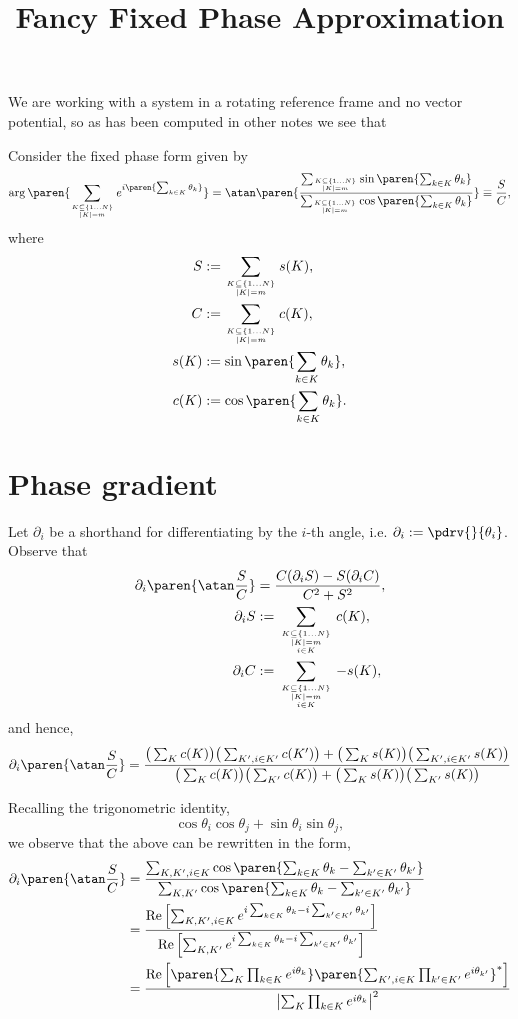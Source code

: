 \documentclass[onecolumn,amsmath,amssymb,nofootinbib,floatfix]{revtex4}
\title{Fancy Fixed Phase Approximation}
\begin{document}
We are working with a system in a rotating reference frame and no vector potential, so as has been computed in other notes we see that

Consider the fixed phase form given by
$$\arg\paren{\sum_{K\subseteq \{1\dots N\}\atop |K|=m} e^{i\paren{\sum_{k\in K} \theta_k}}}=\atan\paren{\frac{\sum_{K\subseteq \{1\dots N\}\atop |K|=m} \sin\paren{\sum_{k\in K} \theta_k}}{\sum_{K\subseteq \{1\dots N\}\atop |K|=m} \cos\paren{\sum_{k\in K} \theta_k}}}\equiv\frac{S}{C},
$$
where
$$
\begin{aligned}
S&:=\sum_{K\subseteq \{1\dots N\}\atop |K|=m} s(K),\\
C&:=\sum_{K\subseteq \{1\dots N\}\atop |K|=m} c(K),\\
s(K)&:=\sin\paren{\sum_{k\in K} \theta_k},\\
c(K)&:=\cos\paren{\sum_{k\in K} \theta_k}.\\
\end{aligned}
$$

\section{Phase gradient}

Let $\partial_i$ be a shorthand for differentiating by the $i$-th angle, i.e. $\partial_i:=\pdrv{}{\theta_i}$.  Observe that
$$
\begin{aligned}
\partial_i \paren{\atan\frac{S}{C}} &= \frac{C(\partial_i S) - S(\partial_i C)}{C^2+S^2},\\
\partial_i S&:=\sum_{{K\subseteq \{1\dots N\}\atop |K|=m}\atop i\in K} c(K),\\
\partial_i C&:=\sum_{{K\subseteq \{1\dots N\}\atop |K|=m}\atop i\in K} -s(K),\\
\end{aligned}
$$
and hence,
$$
\partial_i \paren{\atan\frac{S}{C}} = \frac{\big(\sum_K c(K)\big)\big(\sum_{K',i\in K'} c(K')\big)+\big(\sum_K s(K)\big)\big(\sum_{K',i\in K'} s(K)\big)}{\big(\sum_K c(K)\big)\big(\sum_{K'} c(K)\big)+\big(\sum_K s(K)\big)\big(\sum_{K'} s(K)\big)}
$$

Recalling the trigonometric identity,
$$\cos\theta_i\cos\theta_j+\sin\theta_i\sin\theta_j,$$
we observe that the above can be rewritten in the form,
$$
\begin{aligned}
\partial_i \paren{\atan\frac{S}{C}}
&= \frac{\sum_{K,K',i\in K}\cos\paren{\sum_{k\in K} \theta_k - \sum_{k'\in K'} \theta_{k'}}}
        {\sum_{K,K'}\cos\paren{\sum_{k\in K} \theta_k - \sum_{k'\in K'} \theta_{k'}}}\\
&= \frac{\text{Re}\left[\sum_{K,K',i\in K}e^{i\sum_{k\in K} \theta_k-i\sum_{k'\in K'} \theta_{k'}}\right]}
        {\text{Re}\left[\sum_{K,K'}e^{i\sum_{k\in K} \theta_k-i\sum_{k'\in K'} \theta_{k'}}\right]}\\
&= \frac{\text{Re}\left[\paren{\sum_{K}\prod_{k\in K}e^{i\theta_k}}\paren{\sum_{K',i\in K}\prod_{k'\in K'}e^{i\theta_{k'}}}^*\right]}
        {\left|\sum_{K}\prod_{k\in K}e^{i\theta_k}\right|^2}\\
\end{aligned}
$$
\end{document}
